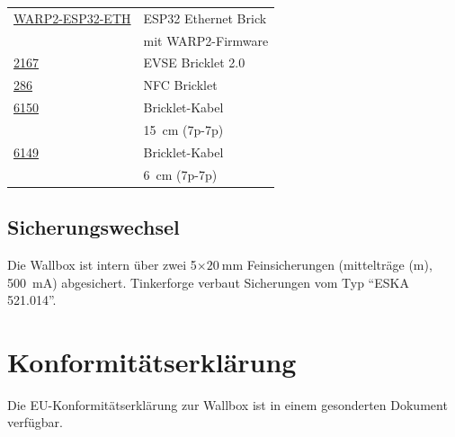 \documentclass[a4paper,10pt]{article}
\begin{document}
\begin{multicols*}{2}
\begin{tabular}{ll}
		\cmidrule(lr{0.5em}){1-2}
		\href{https://www.tinkerforge.com/de/shop/warp/warp2-spare-parts/warp2-esp32-eth.html}{WARP2-ESP32-ETH}	                    & ESP32 Ethernet Brick                 \\
		                                                                                                                            & mit WARP2-Firmware                   \\
		\cmidrule(lr{0.5em}){1-2}
		\href{https://www.tinkerforge.com/de/shop/warp/warp2-spare-parts/evse-v2-bricklet.html}{2167}                               & EVSE Bricklet 2.0                    \\
		\cmidrule(lr{0.5em}){1-2}
		\href{https://www.tinkerforge.com/de/shop/warp/warp2-spare-parts/nfc-bricklet.html}{286}                                    & NFC Bricklet                         \\
		\cmidrule(lr{0.5em}){1-2}
		\href{https://www.tinkerforge.com/de/shop/accessories/cable/bricklet-cable-15cm-7p-7p.html}{6150}                           & Bricklet-Kabel                       \\
		                                                                                                                            & \SI{15}{\centi\meter} (7p-7p)        \\
		\cmidrule(lr{0.5em}){1-2}
		\href{https://www.tinkerforge.com/de/shop/accessories/cable/bricklet-cable-6cm-7p-7p.html}{6149}                            & Bricklet-Kabel                       \\
		                                                                                                                            & \SI{6}{\centi\meter} (7p-7p)         \\
	\end{tabular}

	\subsection{Sicherungswechsel}
	Die Wallbox ist intern über zwei 5$\times\SI{20}{\milli\meter}$ Feinsicherungen (mittelträge (m), \SI{500}{\milli\ampere}) abgesichert.
	Tinkerforge verbaut Sicherungen vom Typ \enquote{ESKA 521.014}.

	\vspace{-0.1cm}
	\section{Konformitätserklärung}
	Die EU-Konformitätserklärung zur Wallbox ist in einem gesonderten Dokument verfügbar.


\end{multicols*}
\end{document}
